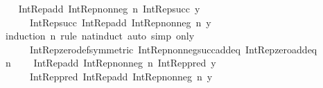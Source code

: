 \begin{isabellebody}
\ \isamarkupfalse%
\ {}{\isacharcolon}{\kern0pt}\ {\isachardoublequoteopen}Int{\isacharunderscore}{\kern0pt}Rep{\isacharunderscore}{\kern0pt}add\ {\isacharparenleft}{\kern0pt}Int{\isacharunderscore}{\kern0pt}Rep{\isacharunderscore}{\kern0pt}nonneg\ n{\isacharparenright}{\kern0pt}\ {\isacharparenleft}{\kern0pt}Int{\isacharunderscore}{\kern0pt}Rep{\isacharunderscore}{\kern0pt}succ\ y{\isacharparenright}{\kern0pt}\ {\isacharequal}{\kern0pt}\isanewline
\ \ \ \ \ \ Int{\isacharunderscore}{\kern0pt}Rep{\isacharunderscore}{\kern0pt}succ\ {\isacharparenleft}{\kern0pt}Int{\isacharunderscore}{\kern0pt}Rep{\isacharunderscore}{\kern0pt}add\ {\isacharparenleft}{\kern0pt}Int{\isacharunderscore}{\kern0pt}Rep{\isacharunderscore}{\kern0pt}nonneg\ n{\isacharparenright}{\kern0pt}\ y{\isacharparenright}{\kern0pt}{\isachardoublequoteclose}\isanewline
\ \ \ \ \isamarkupfalse%
\ {\isacharparenleft}{\kern0pt}induction\ n\ rule{\isacharcolon}{\kern0pt}\ nat{\isacharunderscore}{\kern0pt}induct{\isacharparenright}{\kern0pt}\ {\isacharparenleft}{\kern0pt}auto\ simp\ only{\isacharcolon}{\kern0pt}\isanewline
\ \ \ \ \ \ Int{\isacharunderscore}{\kern0pt}Rep{\isacharunderscore}{\kern0pt}zero{\isacharunderscore}{\kern0pt}def{\isacharbrackleft}{\kern0pt}symmetric{\isacharbrackright}{\kern0pt}\ Int{\isacharunderscore}{\kern0pt}Rep{\isacharunderscore}{\kern0pt}nonneg{\isacharunderscore}{\kern0pt}succ{\isacharunderscore}{\kern0pt}add{\isacharunderscore}{\kern0pt}eq\ Int{\isacharunderscore}{\kern0pt}Rep{\isacharunderscore}{\kern0pt}zero{\isacharunderscore}{\kern0pt}add{\isacharunderscore}{\kern0pt}eq{\isacharparenright}{\kern0pt}\isanewline
\ \ \ \ \isamarkupfalse%
\ {\isacartoucheopen}n\ {\isasymin}\ {\isasymnat}{\isacartoucheclose}\ \isamarkupfalse%
\ {\isachardoublequoteopen}Int{\isacharunderscore}{\kern0pt}Rep{\isacharunderscore}{\kern0pt}add\ {\isacharparenleft}{\kern0pt}Int{\isacharunderscore}{\kern0pt}Rep{\isacharunderscore}{\kern0pt}nonneg\ n{\isacharparenright}{\kern0pt}\ {\isacharparenleft}{\kern0pt}Int{\isacharunderscore}{\kern0pt}Rep{\isacharunderscore}{\kern0pt}pred\ y{\isacharparenright}{\kern0pt}\ {\isacharequal}{\kern0pt}\isanewline
\ \ \ \ \ \ Int{\isacharunderscore}{\kern0pt}Rep{\isacharunderscore}{\kern0pt}pred\ {\isacharparenleft}{\kern0pt}Int{\isacharunderscore}{\kern0pt}Rep{\isacharunderscore}{\kern0pt}add\ {\isacharparenleft}{\kern0pt}Int{\isacharunderscore}{\kern0pt}Rep{\isacharunderscore}{\kern0pt}nonneg\ n{\isacharparenright}{\kern0pt}\ y{\isacharparenright}{\kern0pt}{\isachardoublequoteclose}\isanewline

\end{isabellebody}
